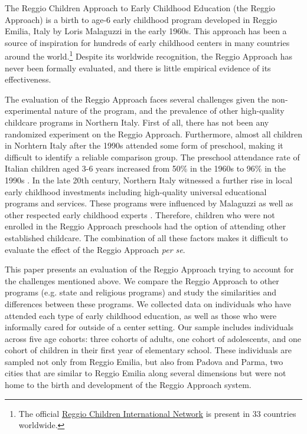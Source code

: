 
The Reggio Children Approach to Early Childhood Education (the Reggio Approach) is a birth to age-6 early childhood program developed in Reggio Emilia, Italy by Loris Malaguzzi in the early 1960s. This approach has been a source of inspiration for hundreds of early childhood centers in many countries around the world.\footnote{The official \href{http://www.reggiochildren.it/network/?lang=en}{Reggio Children International Network} is present in 33 countries worldwide.} Despite its worldwide recognition, the Reggio Approach has never been formally evaluated, and there is little empirical evidence of its effectiveness. 

The evaluation of the Reggio Approach faces several challenges given the non-experimental nature of the program, and the prevalence of other high-quality childcare programs in Northern Italy. First of all, there has not been any randomized experiment on the Reggio Approach. Furthermore, almost all children in Norhtern Italy after the 1990s attended some form of preschool, making it difficult to identify a reliable comparison group. The preschool attendance rate of Italian children aged 3-6 years increased from 50\% in the 1960s to 96\% in the 1990s \citep{Hohnerlein_2015_Development-and-Diffusion}. In the late 20th century, Northern Italy witnessed a further rise in local early childhood investments including high-quality universal educational programs and services. These programs were influenced by Malaguzzi as well as other respected early childhood experts \citep{OECD_2001_Italy-Country-Note}. Therefore, children who were not enrolled in the Reggio Approach preschools had the option of attending other established childcare.  The combination of all these factors makes it difficult to evaluate the effect of the Reggio Approach \textit{per se}. 

This paper presents an evaluation of the Reggio Approach trying to account for the challenges mentioned above. We compare the Reggio Approach to other programs (e.g. state and religious programs) and study the similarities and differences between these programs. We collected data on individuals who have attended each type of early childhood education, as well as those who were informally cared for outside of a center setting. Our sample includes individuals across five age cohorts: three cohorts of adults, one cohort of adolescents, and one cohort of children in their first year of elementary school. These individuals are sampled not only from Reggio Emilia, but also from Padova and Parma, two cities that are similar to Reggio Emilia along several dimensions but were not home to the birth and development of the Reggio Approach system.

